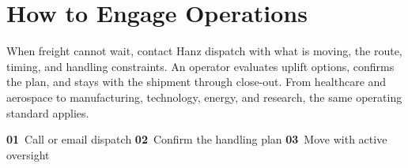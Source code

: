 \documentclass[10pt]{article}
\begin{document}
\vspace{5pt}
\section*{How to Engage Operations}
{\fontsize{9.4}{11.6}\selectfont\color{HanzBlue!93}%
When freight cannot wait, contact Hanz dispatch with what is moving, the route, timing, and handling constraints. An operator evaluates uplift options, confirms the plan, and stays with the shipment through close-out. From healthcare and aerospace to manufacturing, technology, energy, and research, the same operating standard applies.\par}
\vspace{3.5pt}
\noindent\setlength{\fboxsep}{0pt}%
\colorbox{HanzLight}{%
  \parbox{\textwidth}{%
    \vspace{7pt}\hspace{11pt}%
    {\fontsize{9.1}{11.4}\selectfont\color{HanzGray}%
      \textbf{\color{HanzOrange}01}\ Call or email dispatch\quad
      \textcolor{HanzOrange}{\textbullet}\quad
      \textbf{\color{HanzOrange}02}\ Confirm the handling plan\quad
      \textcolor{HanzOrange}{\textbullet}\quad
      \textbf{\color{HanzOrange}03}\ Move with active oversight\par}%
    \hspace{11pt}\vspace{7pt}%
  }%
}

\enlargethispage{18pt}
\vspace{6pt}
\end{document}
